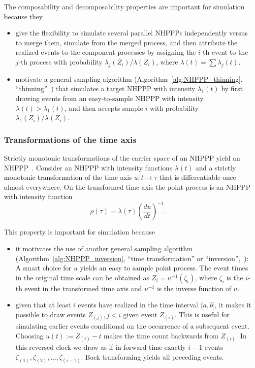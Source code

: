 \documentclass[article,nojss]{jss}\usepackage[]{graphicx}\usepackage[]{xcolor}
\newcommand{\der}[2]{\frac{d {#1}} {d{#2}}}
\begin{document}
The composability and decomposability properties are important for simulation because they
\begin{itemize}
    \item give the flexibility to simulate several parallel NHPPPs independently versus to merge them, simulate from the merged process, and then attribute the realized events to the component processes by assigning the $i$-th event to the $j$-th process with probability $\lambda_j(Z_i) / \lambda(Z_i)$, where $\lambda(t) = \sum \lambda_j(t)$.
    \item motivate a general sampling algorithm (Algorithm~\ref{alg:NHPPP_thinning}, ``thinning''~\citep{lewis1979thinning}) that simulates a target NHPPP with intensity $\lambda_1(t)$ by first drawing events from an easy-to-sample NHPPP with intensity $\lambda(t) >\lambda_1(t)$, and then accepts sample $i$ with probability $\lambda_1(Z_i)/\lambda(Z_i)$.
\end{itemize}

\subsubsection{Transformations of the time axis}
Strictly monotonic transformations of the carrier space of an NHPPP yield an NHPPP~\citep[]{Cinlar1975inversion}. Consider an NHPPP with intensity functions $\lambda(t)$ and a strictly monotonic transformation of the time axis $u: t \mapsto \tau$ that is differentiable once almost everywhere. On the transformed time axis the point process is an NHPPP with intensity function
\begin{equation}\label{eq:transform}
    \rho(\tau) = \lambda(\tau) \left ( \der{u}{t} \right )^{-1}.
\end{equation}

This property is important for simulation because
\begin{itemize}
    \item it motivates the use of another general sampling algorithm (Algorithm~\ref{alg:NHPPP_inversion}, ``time transformation'' or ``inversion'',~\citet{Cinlar1975inversion}): A smart choice for $u$ yields an easy to sample point process. The event times in the original time scale can be obtained as $Z_i = u^{-1}(\zeta_i)$, where $\zeta_i$ is the $i$-th event in the transformed time axis and $u^{-1}$ is the inverse function of $u$.
    \item given that at least $i$ events have realized in the time interval $(a, b]$, it makes it possible to draw events ${Z_{(j)}, j<i}$ given event $Z_{(i)}$. This is useful for simulating earlier events conditional on the occurrence of a subsequent event. Choosing $u(t) := Z_{(i)} - t$ makes the time count backwards from $Z_{(i)}$. In this reversed clock we draw as if in forward time exactly $i-1$ events $\zeta_{(1)}, \zeta_{(2)}, \dots, \zeta_{(i-1)}$. Back transforming yields all preceding events.
\end{itemize}
\end{document}
